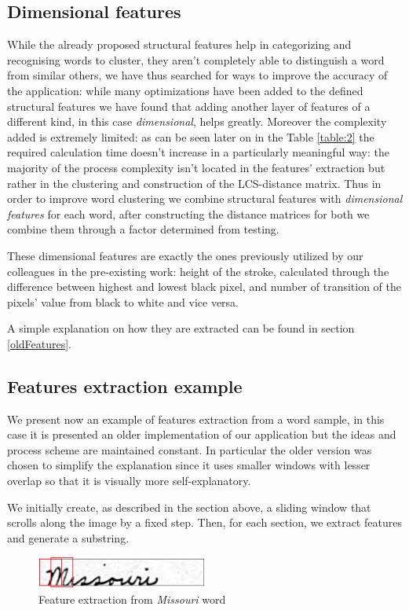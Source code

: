 \subsection{Dimensional features}
While the already proposed structural features help in categorizing and recognising words to cluster, they aren't completely able to distinguish a word from similar others, we have thus searched for ways to improve the accuracy of the application:
while many optimizations have been added to the defined structural features we have found that adding another layer of features of a different kind, in this case \emph{dimensional}, helps greatly.
Moreover the complexity added is extremely limited: as can be seen later on in the Table \ref{table:2} the required calculation time doesn't increase in a particularly meaningful way: the majority of the process complexity isn't located in the features' extraction but rather in the clustering and construction of the LCS-distance matrix.  
Thus in order to improve word clustering we combine structural features with \emph{dimensional features} for each word, after constructing the distance matrices for both we combine them through a factor determined from testing. 

These dimensional features are exactly the ones previously utilized by our colleagues in the pre-existing work: height of the stroke, calculated through the difference between highest and lowest black pixel, and number of transition of the pixels' value from black to white and vice versa.

A simple explanation on how they are extracted can be found in section \ref{oldFeatures}.

\subsection{Features extraction example}

We present now an example of features extraction from a word sample, in this case it is presented an older implementation of our application but the ideas and process scheme are maintained constant.
In particular the older version was chosen to simplify the explanation since it uses smaller windows with lesser overlap so that it is visually more self-explanatory.

We initially create, as described in the section above, a sliding window that scrolls along the image by a fixed step. Then, for each section, we extract features and generate a substring.

\begin{figure}[!htpb]
\centering
\includegraphics[width=0.5\textwidth]{images/missouri_crop.jpg}
\caption{Feature extraction from \emph{Missouri} word}
\end{figure} 

